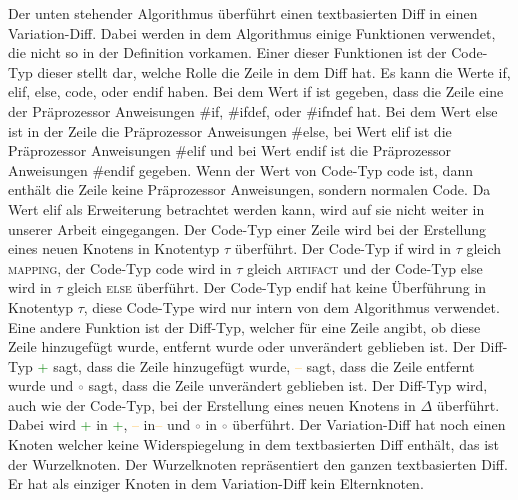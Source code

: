 Der unten stehender Algorithmus überführt einen textbasierten Diff in einen Variation-Diff. Dabei werden in dem Algorithmus einige Funktionen verwendet, die nicht so in der Definition vorkamen. Einer dieser Funktionen ist der Code-Typ dieser stellt dar, welche Rolle die Zeile in dem Diff hat. Es kann die Werte if, elif, else, code, oder endif haben. Bei dem Wert if ist gegeben, dass die Zeile eine der Präprozessor Anweisungen \#if, \#ifdef, oder \#ifndef hat. Bei dem Wert else ist in der Zeile die Präprozessor Anweisungen \#else, bei Wert elif ist  die Präprozessor Anweisungen \#elif und bei Wert endif ist  die Präprozessor Anweisungen \#endif gegeben. Wenn der Wert von Code-Typ code ist, dann enthält die Zeile keine Präprozessor Anweisungen, sondern normalen Code. Da Wert elif als Erweiterung betrachtet werden kann, wird auf sie nicht weiter in unserer Arbeit eingegangen. Der Code-Typ einer Zeile wird bei der Erstellung eines neuen Knotens in Knotentyp $\tau$ überführt. Der Code-Typ if wird in $\tau$ gleich \textsc{mapping}, der Code-Typ code wird in $\tau$ gleich \textsc{artifact} und der Code-Typ else wird in $\tau$ gleich \textsc{else} überführt. Der Code-Typ endif hat keine Überführung in Knotentyp $\tau$, diese Code-Type wird nur intern von dem Algorithmus verwendet. Eine andere Funktion ist der Diff-Typ, welcher für eine Zeile angibt, ob diese Zeile hinzugefügt wurde, entfernt wurde oder unverändert geblieben ist. Der Diff-Typ \textcolor{green}{+} sagt, dass die Zeile hinzugefügt wurde, \textcolor{orange}{--} sagt, dass die Zeile entfernt wurde und \textcolor{gray}{$\circ$} sagt, dass die Zeile unverändert geblieben ist. Der Diff-Typ wird, auch wie der Code-Typ, bei der Erstellung eines neuen Knotens in $\Delta$ überführt. Dabei wird \textcolor{green}{+} in \textcolor{green}{+}, \textcolor{orange}{--} in\textcolor{orange}{--} und \textcolor{gray}{$\circ$} in \textcolor{gray}{$\circ$} überführt. Der Variation-Diff hat noch einen Knoten welcher keine Widerspiegelung in dem textbasierten Diff enthält, das ist der Wurzelknoten. Der Wurzelknoten repräsentiert den ganzen textbasierten Diff. Er hat als einziger Knoten in dem Variation-Diff kein Elternknoten.


